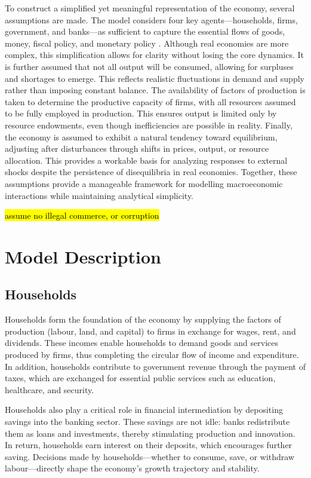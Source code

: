 \documentclass[10pt,onecolumn]{witseiepaper}
\begin{document}
To construct a simplified yet meaningful representation of the economy, several assumptions are made.  
The model considers four key agents—households, firms, government, and banks—as sufficient to capture the essential flows of goods, money, fiscal policy, and monetary policy \cite{wolf2013multi}. Although real economies are more complex, this simplification allows for clarity without losing the core dynamics.  
It is further assumed that not all output will be consumed, allowing for surpluses and shortages to emerge. This reflects realistic fluctuations in demand and supply rather than imposing constant balance.  
The availability of factors of production is taken to determine the productive capacity of firms, with all resources assumed to be fully employed in production. This ensures output is limited only by resource endowments, even though inefficiencies are possible in reality.  
Finally, the economy is assumed to exhibit a natural tendency toward equilibrium, adjusting after disturbances through shifts in prices, output, or resource allocation. This provides a workable basis for analyzing responses to external shocks despite the persistence of disequilibria in real economies.  
Together, these assumptions provide a manageable framework for modelling macroeconomic interactions while maintaining analytical simplicity.

\hl{assume no illegal commerce, or corruption}


\section{Model Description}

\subsection{Households}
Households form the foundation of the economy by supplying the factors of production (labour, land, and capital) to firms in exchange for wages, rent, and dividends. These incomes enable households to demand goods and services produced by firms, thus completing the circular flow of income and expenditure. In addition, households contribute to government revenue through the payment of taxes, which are exchanged for essential public services such as education, healthcare, and security.  

Households also play a critical role in financial intermediation by depositing savings into the banking sector. These savings are not idle: banks redistribute them as loans and investments, thereby stimulating production and innovation. In return, households earn interest on their deposits, which encourages further saving. Decisions made by households—whether to consume, save, or withdraw labour—directly shape the economy’s growth trajectory and stability.
\end{document}
